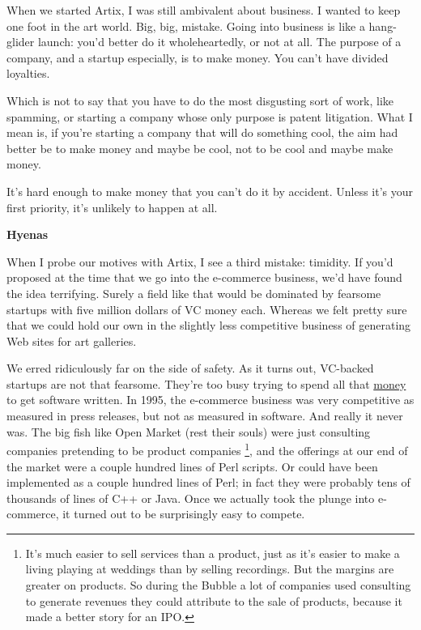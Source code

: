 When we started Artix, I was still ambivalent about business. I wanted
to keep one foot in the art world. Big, big, mistake. Going into
business is like a hang-glider launch: you'd better do it
wholeheartedly, or not at all. The purpose of a company, and a startup
especially, is to make money. You can't have divided loyalties.

Which is not to say that you have to do the most disgusting sort of
work, like spamming, or starting a company whose only purpose is patent
litigation. What I mean is, if you're starting a company that will do
something cool, the aim had better be to make money and maybe be cool,
not to be cool and maybe make money.

It's hard enough to make money that you can't do it by accident. Unless
it's your first priority, it's unlikely to happen at all.

\textbf{Hyenas}

When I probe our motives with Artix, I see a third mistake: timidity. If
you'd proposed at the time that we go into the e-commerce business, we'd
have found the idea terrifying. Surely a field like that would be
dominated by fearsome startups with five million dollars of VC money
each. Whereas we felt pretty sure that we could hold our own in the
slightly less competitive business of generating Web sites for art
galleries.

We erred ridiculously far on the side of safety. As it turns out,
VC-backed startups are not that fearsome. They're too busy trying to
spend all that \href{venturecapital.html}{money} to get software
written. In 1995, the e-commerce business was very competitive as
measured in press releases, but not as measured in software. And really
it never was. The big fish like Open Market (rest their souls) were just
consulting companies pretending to be product companies
\footnote{It's much easier to sell services than a product, just as it's
easier to make a living playing at weddings than by selling recordings.
But the margins are greater on products. So during the Bubble a lot of
companies used consulting to generate revenues they could attribute to
the sale of products, because it made a better story for an IPO.}, and the offerings at our end of the market were
a couple hundred lines of Perl scripts. Or could have been implemented
as a couple hundred lines of Perl; in fact they were probably tens of
thousands of lines of C++ or Java. Once we actually took the plunge into
e-commerce, it turned out to be surprisingly easy to compete.

